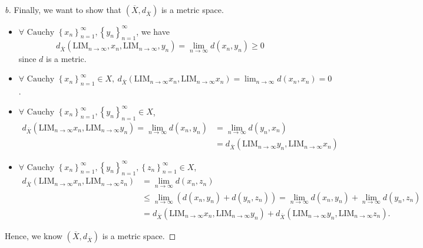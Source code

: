 \begin{proof}[b]
  Finally, we want to show that \(\left( \overline{X}, d_{\overline{X} }  \right) \) is a metric space. 
  \begin{itemize}
    \item \(\forall \text{ Cauchy } \left\{x_n\right\}_{n=1}^{\infty}, \left\{y_n\right\}_{n=1}^{\infty}\), we have 
    \[
        d_{\overline{X}}(\mathrm{LIM}_{n \to \infty}, x_n, \mathrm{LIM}_{n \to \infty}, y_n) = \lim_{n \to \infty} d(x_n, y_n) \ge 0
    \] since \(d\) is a metric.
    \item \(\forall \text{ Cauchy } \left\{ x_n \right\}_{n=1}^{\infty} \in X, \ d_{\overline{X} } (\mathrm{LIM}_{n \to \infty } x_n, \mathrm{LIM}_{n\to \infty } x_n  ) = \lim_{n \to \infty} d(x_n, x_n) = 0  \). 
    \item \(\forall \text{ Cauchy } \left\{ x_n \right\}_{n=1}^{\infty} , \left\{ y_n \right\}_{n=1}^{\infty} \in X  \), 
    \begin{align*}
      d_{\overline{X} }(\mathrm{LIM}_{n \to \infty }x_n, \mathrm{LIM}_{n \to \infty }y_n  ) = \lim_{n \to \infty} d(x_n, y_n)  &= \lim_{n \to \infty} d(y_n, x_n) \\ &= d_{\overline{X}} (\mathrm{LIM}_{n \to \infty } y_n, \mathrm{LIM}_{n \to \infty } x_n  )   
    \end{align*}
    \item \(\forall \text{ Cauchy } \left\{ x_n \right\}_{n=1}^{\infty} , \left\{ y_n \right\}_{n=1}^{\infty}, \left\{ z_n \right\}_{n=1}^{\infty}   \in X  \), \begin{align*}
      d_{\overline{X} }(\mathrm{LIM}_{n \to \infty }x_n, \mathrm{LIM}_{n \to \infty }z_n  ) &= \lim_{n \to \infty} d(x_n, z_n) \\
      &\le \lim_{n \to \infty} (d(x_n, y_n) + d(y_n, z_n)) = \lim_{n \to \infty} d(x_n, y_n) + \lim_{n \to \infty} d(y_n, z_n) \\
      &= d_{\overline{X} } (\mathrm{LIM}_{n \to \infty }x_n, \mathrm{LIM}_{n \to \infty }y_n ) + d_{\overline{X} } (\mathrm{LIM}_{n \to \infty }y_n, \mathrm{LIM}_{n \to \infty }z_n ). 
    \end{align*}
  \end{itemize}
  Hence, we know \(\left( \overline{X}, d_{\overline{X} }  \right) \) is a metric space. 
\end{proof}
